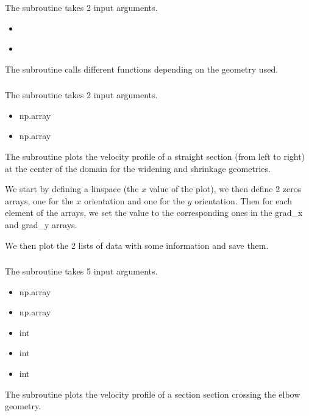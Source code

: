 \subsubsection{}
The subroutine \textcolor{func}{} takes 2 input arguments.
\begin{itemize}
      \item {} \textcolor{dtype}{}
      \item {} \textcolor{dtype}{}
\end{itemize}
The subroutine calls different functions depending on the geometry used.

\subsubsection{}
The subroutine \textcolor{func}{} takes 2 input
arguments.
\begin{itemize}
      \item {} \textcolor{dtype}{np.array}
      \item {} \textcolor{dtype}{np.array}
\end{itemize}
The subroutine plots the velocity profile of a straight section (from left to
right) at the center of the domain for the widening and shrinkage geometries.

We start by defining a linspace (the $x$ value of the plot), we then define
2 zeros arrays, one for the $x$ orientation and one for the $y$ orientation.
Then for each element of the arrays, we set the value to the corresponding ones
in the grad\_x and grad\_y arrays.

We then plot the 2 lists of data with some information and save them.

\subsubsection{}
The subroutine \textcolor{func}{} takes 5 input arguments.
\begin{itemize}
      \item {} \textcolor{dtype}{np.array}
      \item {} \textcolor{dtype}{np.array}
      \item {} \textcolor{dtype}{int}
      \item {} \textcolor{dtype}{int}
      \item {} \textcolor{dtype}{int}
\end{itemize}
The subroutine plots the velocity profile of a section section crossing the elbow
geometry.

